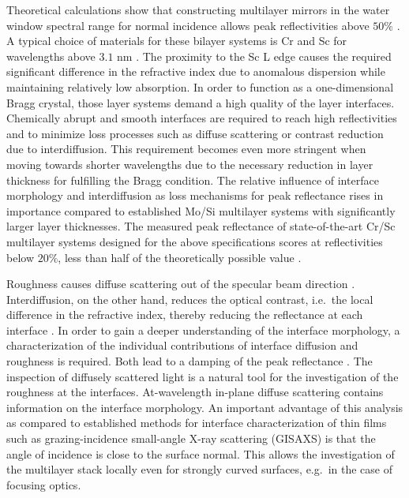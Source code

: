 Theoretical calculations show that constructing multilayer mirrors in the water 
window spectral range for normal incidence allows peak reflectivities above 
$50\%$ \cite{schafers_cr/sc_1998}. A typical choice of materials for these bilayer 
systems is Cr and Sc for wavelengths above $3.1$ nm \cite{salashchenko_short-period_1997, 
schafers_cr/sc_1998}. The proximity to the Sc L edge causes the required significant 
difference in the refractive index due to anomalous dispersion while 
maintaining relatively low absorption. In order to function as a 
one-dimensional Bragg crystal, those layer systems demand a high quality of the 
layer interfaces. Chemically abrupt and smooth interfaces are required to reach 
high reflectivities and to minimize loss processes such as diffuse scattering 
or contrast reduction due to interdiffusion. This requirement becomes even more 
stringent when moving towards shorter wavelengths due to the necessary 
reduction in layer thickness for fulfilling the Bragg condition.
The relative influence of interface morphology and interdiffusion as loss 
mechanisms for peak reflectance rises in importance compared to established 
Mo/Si multilayer systems with significantly larger layer thicknesses. The 
measured peak reflectance of state-of-the-art Cr/Sc multilayer systems designed 
for the above specifications scores at reflectivities below $20\%$, less than 
half of the theoretically possible value \cite{eriksson_14.5_2003, 
yulin_high-performance_2004}.

Roughness causes diffuse scattering out of the specular beam direction 
\cite{sinha_x-ray_1994}. Interdiffusion, on the other hand, 
reduces the optical contrast, i.e.~the local difference in the refractive 
index, thereby reducing the reflectance at each interface 
\cite{nakajima_interdiffusion_1988}. In order to gain a deeper understanding of the 
interface morphology, a characterization of the individual contributions of 
interface diffusion and roughness is required. Both lead to a damping of the 
peak reflectance \cite{croce_p._etude_1976}. The inspection of diffusely scattered 
light is a natural tool for the investigation of the roughness at the 
interfaces. At-wavelength in-plane diffuse scattering contains information on 
the interface morphology. An important advantage of this analysis as compared 
to established methods for interface characterization of thin films such as 
grazing-incidence small-angle X-ray scattering (GISAXS) \cite{levine_grazing-incidence_1989} is 
that the angle of incidence is close to the surface normal. This allows the 
investigation of the multilayer stack locally even for strongly curved 
surfaces, e.g.~in the case of focusing optics.


